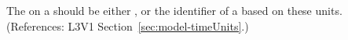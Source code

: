 The  on a \Model should be either ,
 or the identifier of a \UnitDefinition based
on these units.  (References: L3V1 Section~\ref{sec:model-timeUnits}.)
